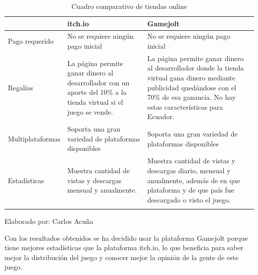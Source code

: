 \documentclass[a4paper, openright, 12pt]{report}
\begin{document}
\begin{longtable}{| p{3cm} | p{3cm} | p{3cm}|}
\hline
\captionsetup{justification=centering,margin=2cm}
\centering
\textbf{} & \textbf{itch.io} & \textbf{Gamejolt}\\ \hline
Pago requerido 
& No se requiere ningún pago inicial 
& No se requiere ningún pago inicial  
 \\ \hline
Regalías 
& La página permite ganar dinero al desarrollador con un aporte del 10\% a la tienda virtual si el juego se vende. 
& La página permite ganar dinero al desarrollador donde la tienda virtual gana dinero mediante publicidad quedándose con el 70\% de esa ganancia. No hay estas características para Ecuador.
 \\ \hline
Multiplataformas 
& Soporta una gran variedad de plataformas disponibles 
& Soporta una gran variedad de plataformas disponibles  
 \\ \hline
Estadísticas 
& Muestra cantidad de vistas y descargas mensual y anualmente.
& Muestra cantidad de vistas y descargas diario, mensual y anualmente, además de en que plataforma y de que país fue descargado o visto el juego. 
 \\ \hline
\caption{Cuadro comparativo de tiendas online}
\label{t:comparacionTO}
\end{longtable}
\begin{center}
Elaborado por: Carlos Acuña
\end{center}
\justify
Con los resultados obtenidos se ha decidido usar la plataforma Gamejolt porque tiene mejores estadísticas que la plataforma itch.io, lo que beneficia para saber mejor la distribución del juego y conocer mejor la opinión de la gente de este juego.
\end{document}
